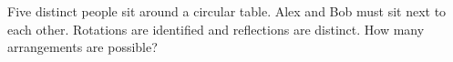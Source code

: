 Five distinct people sit around a circular table. Alex and Bob must sit next to each other. Rotations are identified and reflections are distinct. How many arrangements are possible?
